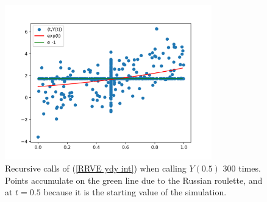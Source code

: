 \documentclass[a4paper,12pt]{article}
\begin{document}
\begin{example}[$y'=y$]
    \begin{figure}[h!]
        \centering
        \includegraphics[width=0.8\textwidth]{plots/ydy int.png}
        \caption{Recursive calls of (\ref{RRVE ydy int}) when
            calling $Y(0.5)$ $300$ times. Points accumulate on
            the green line due to the Russian roulette,
            and at  $t=0.5$ because it is the starting
            value of the simulation.
        }
        \label{fig:ydy int}
    \end{figure}

\end{example}
\end{document}
